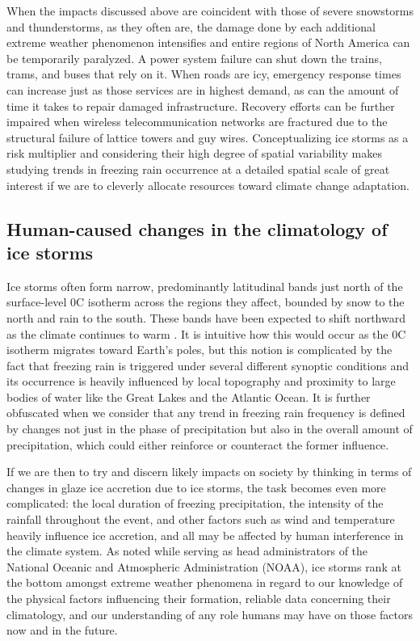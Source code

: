 \documentclass[twocol]{ametsoc}
\begin{document}
When the impacts discussed above are coincident with those of severe snowstorms and thunderstorms, as they often are, the damage done by each additional extreme weather phenomenon intensifies and entire regions of North America can be temporarily paralyzed. A power system failure can shut down the trains, trams, and buses that rely on it. When roads are icy, emergency response times can increase just as those services are in highest demand, as can the amount of time it takes to repair damaged infrastructure. Recovery efforts can be further impaired when wireless telecommunication networks are fractured due to the structural failure of lattice towers and guy wires. Conceptualizing ice storms as a risk multiplier and considering their high degree of spatial variability makes studying trends in freezing rain occurrence at a detailed spatial scale of great interest if we are to cleverly allocate resources toward climate change adaptation.

\subsection{Human-caused changes in the climatology of ice storms}
Ice storms often form narrow, predominantly latitudinal bands just north of the surface-level 0\degree C isotherm across the regions they affect, bounded by snow to the north and rain to the south. These bands have been expected to shift northward as the climate continues to warm \citep{cheng2011possible,lambert2011simulated}. It is intuitive how this would occur as the 0\degree C isotherm migrates toward Earth's poles, but this notion is complicated by the fact that freezing rain is triggered under several different synoptic conditions and its occurrence is heavily influenced by local topography and proximity to large bodies of water like the Great Lakes and the Atlantic Ocean. It is further obfuscated when we consider that any trend in freezing rain frequency is defined by changes not just in the phase of precipitation but also in the overall amount of precipitation, which could either reinforce or counteract the former influence. 

If we are then to try and discern likely impacts on society by thinking in terms of changes in glaze ice accretion due to ice storms, the task becomes even more complicated: the local duration of freezing precipitation, the intensity of the rainfall throughout the event, and other factors such as wind and temperature heavily influence ice accretion, and all may be affected by human interference in the climate system.  As \citet{lubchenco2012extreme} noted while serving as head administrators of the National Oceanic and Atmospheric Administration (NOAA), ice storms rank at the bottom amongst extreme weather phenomena in regard to our knowledge of the physical factors influencing their formation, reliable data concerning their climatology, and our understanding of any role humans may have on those factors now and in the future.
\end{document}
